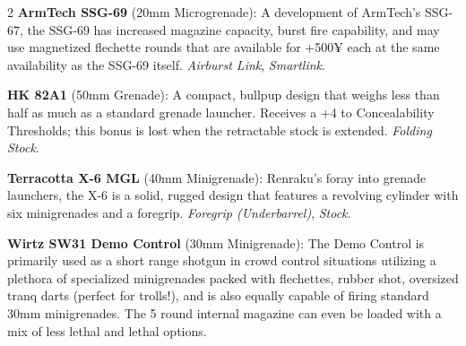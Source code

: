\documentclass[
  oneside]{article}
\begin{document}
\begin{multicols}{2}
\textbf{ArmTech SSG-69} (20mm Microgrenade): A
development of ArmTech's SSG-67, the SSG-69 has
increased magazine capacity, burst fire
capability, and may use magnetized flechette
rounds that are available for +500¥ each at the
same availability as the SSG-69 itself.
\emph{Airburst Link}, \emph{Smartlink}.

\textbf{HK 82A1} (50mm Grenade): A compact,
bullpup design that weighs less than half as much
as a standard grenade launcher. Receives a +4 to
Concealability Thresholds; this bonus is lost when
the retractable stock is extended. \emph{Folding
Stock}.

\textbf{Terracotta X-6 MGL} (40mm Minigrenade):
Renraku's foray into grenade launchers, the X-6 is
a solid, rugged design that features a revolving
cylinder with six minigrenades and a foregrip.
\emph{Foregrip (Underbarrel)}, \emph{Stock}.

\textbf{Wirtz SW31 Demo Control} (30mm
Minigrenade): The Demo Control is primarily used
as a short range shotgun in crowd control
situations utilizing a plethora of specialized
minigrenades packed with flechettes, rubber shot,
oversized tranq darts (perfect for trolls!), and
is also equally capable of firing standard 30mm
minigrenades. The 5 round internal magazine can
even be loaded with a mix of less lethal and
lethal options.

\end{multicols}
\end{document}
